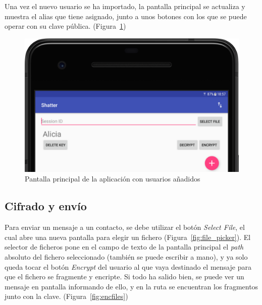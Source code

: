 Una vez el nuevo usuario se ha importado, la pantalla principal se actualiza y muestra el alias que tiene asignado, junto a unos botones con los que se puede operar con su clave pública. (Figura~\ref{fig:home_2})

\begin{figure}[!htb]
  \centering
  \includegraphics[scale=0.4]{Figures/home_2}
  \decoRule
  \caption[Shatter (Pantalla principal con usuarios)]{Pantalla principal de la aplicación con usuarios añadidos}
  \label{fig:home_2}
\end{figure}

\subsection{Cifrado y envío}

Para enviar un mensaje a un contacto, se debe utilizar el botón \emph{Select File}, el cual abre una nueva pantalla para elegir un fichero (Figura~\ref{fig:file_picker}). El selector de ficheros pone en el campo de texto de la pantalla principal el \emph{path} absoluto del fichero seleccionado (también se puede escribir a mano), y ya solo queda tocar el botón \emph{Encrypt} del usuario al que vaya destinado el mensaje para que el fichero se fragmente y encripte. Si todo ha salido bien, se puede ver un mensaje en pantalla informando de ello, y en la ruta  se encuentran los fragmentos junto con la clave. (Figura~\ref{fig:encfiles})

